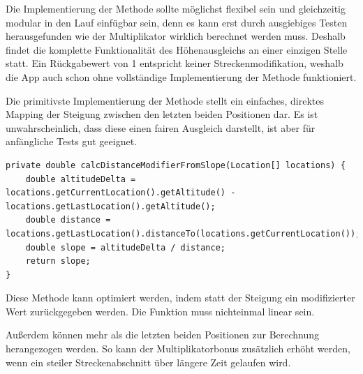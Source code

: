 Die Implementierung der Methode sollte möglichst flexibel sein und gleichzeitig modular in den Lauf einfügbar sein, denn es kann erst durch ausgiebiges Testen herausgefunden wie der Multiplikator wirklich berechnet werden muss. Deshalb findet die komplette Funktionalität des Höhenausgleichs an einer einzigen Stelle statt. Ein Rückgabewert von 1 entspricht keiner Streckenmodifikation, weshalb die App auch schon ohne vollständige Implementierung der Methode funktioniert.

Die primitivste Implementierung der Methode stellt ein einfaches, direktes Mapping der Steigung zwischen den letzten beiden Positionen dar. Es ist unwahrscheinlich, dass diese einen fairen Ausgleich darstellt, ist aber für anfängliche Tests gut geeignet.
\lstset{language=java}
\begin{lstlisting}[frame=htrbl, caption={Primitive Implementierung der Methode}, breaklines=true]
private double calcDistanceModifierFromSlope(Location[] locations) {
	double altitudeDelta = locations.getCurrentLocation().getAltitude() - locations.getLastLocation().getAltitude();
	double distance = locations.getLastLocation().distanceTo(locations.getCurrentLocation());
	double slope = altitudeDelta / distance;
	return slope;
}
\end{lstlisting}

Diese Methode kann optimiert werden, indem statt der Steigung ein modifizierter Wert zurückgegeben werden. Die Funktion muss nichteinmal linear sein.

Außerdem können mehr als die letzten beiden Positionen zur Berechnung herangezogen werden. So kann der Multiplikatorbonus zusätzlich erhöht werden, wenn ein steiler Streckenabschnitt über längere Zeit gelaufen wird.